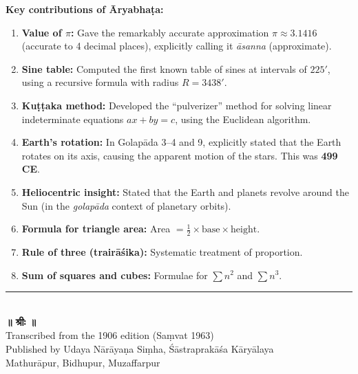 \documentclass[11pt,a4paper]{article}
\newcommand{\dev}[1]{{\devanagarifont #1}}
\begin{document}
\vspace{0.5cm}

\noindent
\textbf{Key contributions of Āryabhaṭa:}
\begin{enumerate}
    \item \textbf{Value of $\pi$:} Gave the remarkably accurate approximation $\pi \approx 3.1416$ (accurate to 4 decimal places), explicitly calling it \textit{āsanna} (approximate).
    \item \textbf{Sine table:} Computed the first known table of sines at intervals of $225'$, using a recursive formula with radius $R = 3438'$.
    \item \textbf{Kuṭṭaka method:} Developed the ``pulverizer'' method for solving linear indeterminate equations $ax + by = c$, using the Euclidean algorithm.
    \item \textbf{Earth's rotation:} In Golapāda 3--4 and 9, explicitly stated that the Earth rotates on its axis, causing the apparent motion of the stars. This was \textbf{499 CE}.
    \item \textbf{Heliocentric insight:} Stated that the Earth and planets revolve around the Sun (in the \textit{golapāda} context of planetary orbits).
    \item \textbf{Formula for triangle area:} Area $= \frac{1}{2} \times \text{base} \times \text{height}$.
    \item \textbf{Rule of three (trairāśika):} Systematic treatment of proportion.
    \item \textbf{Sum of squares and cubes:} Formulae for $\sum n^2$ and $\sum n^3$.
\end{enumerate}

\vspace{0.5cm}

\begin{center}
\textcolor{rulecolor}{\rule{0.6\textwidth}{0.4pt}}\\[0.8em]
\dev{\textbf{॥ श्रीः ॥}}\\[0.3em]
{\small Transcribed from the 1906 edition (Saṃvat 1963)}\\[0.2em]
{\small Published by Udaya Nārāyaṇa Siṃha, Śāstraprakāśa Kāryālaya}\\[0.2em]
{\small Mathurāpur, Bidhupur, Muzaffarpur}
\end{center}
\end{document}
